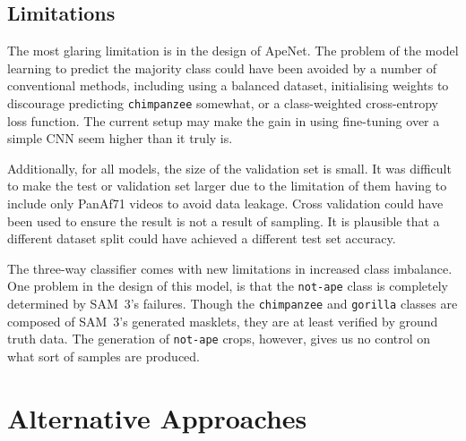 \documentclass[author={Jacob Stephenson},
    degree={BSc},
    title={Robust Great Ape Species Detection in Wild Camera Trap Imagery with Promptable Concept Segmentation},
    unit={COMS30045},
    subtitle={}]{dissertation}
\begin{document}
\subsection{Limitations}

The most glaring limitation is in the design of ApeNet. The problem of the model learning to predict the majority class could have been avoided by a number of conventional methods, including using a balanced dataset, initialising weights to discourage predicting \texttt{chimpanzee} somewhat, or a class-weighted cross-entropy loss function. The current setup may make the gain in using fine-tuning over a simple CNN seem higher than it truly is.

Additionally, for all models, the size of the validation set is small. It was difficult to make the test or validation set larger due to the limitation of them having to include only PanAf71 videos to avoid data leakage. Cross validation could have been used to ensure the result is not a result of sampling. It is plausible that a different dataset split could have achieved a different test set accuracy.

The three-way classifier comes with new limitations in increased class imbalance. One problem in the design of this model, is that the \texttt{not-ape} class is completely determined by SAM~3's failures. Though the \texttt{chimpanzee} and \texttt{gorilla} classes are composed of SAM~3's generated masklets, they are at least verified by ground truth data. The generation of \texttt{not-ape} crops, however, gives us no control on what sort of samples are produced.



\section{Alternative Approaches}
\label{sec:eval_alternatives}
\end{document}
